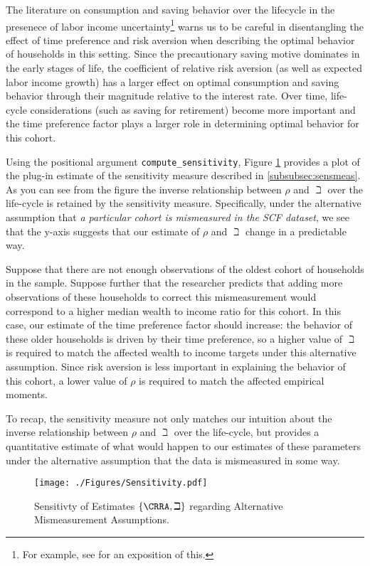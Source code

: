\documentclass[\econtexRoot/SolvingMicroDSOPs]{subfiles}
\begin{document}
The literature on consumption and saving behavior over the lifecycle in the presenece of labor income uncertainty\footnote{For example, see \cite{gpLifecycle} for an exposition of this.} warns us to be careful in disentangling the effect of time preference and risk aversion when describing the optimal behavior of households in this setting.  Since the precautionary saving motive dominates in the early stages of life, the coefficient of relative risk aversion (as well as expected labor income growth) has a larger effect on optimal consumption and saving behavior through their magnitude relative to the interest rate. Over time, life-cycle considerations (such as saving for retirement) become more important and the time preference factor plays a larger role in determining optimal behavior for this cohort.

Using the positional argument \texttt{compute\_sensitivity}, Figure \ref{fig:PlotSensitivityMeasure} provides a plot of the plug-in estimate of the sensitivity measure described in \ref{subsubsec:sensmeas}. As you can see from the figure the inverse relationship between $\rho$ and $\beth$ over the life-cycle is retained by the sensitivity measure. Specifically, under the alternative assumption that \textit{a particular cohort is mismeasured in the SCF dataset}, we see that the y-axis suggests that our estimate of $\rho$ and $\beth$ change in a predictable way.

Suppose that there are not enough observations of the oldest cohort of households in the sample. Suppose further that the researcher predicts that adding more observations of these households to correct this mismeasurement would correspond to a higher median wealth to income ratio for this cohort. In this case, our estimate of the time preference factor should increase: the behavior of these older households is driven by their time preference, so a higher value of $\beth$ is required to match the affected wealth to income targets under this alternative assumption. Since risk aversion is less important in explaining the behavior of this cohort, a lower value of $\rho$ is required to match the affected empirical moments.

To recap, the sensitivity measure not only matches our intuition about the inverse relationship between $\rho$ and $\beth$ over the life-cycle, but provides a quantitative estimate of what would happen to our estimates of these parameters under the alternative assumption that the data is mismeasured in some way.

\hypertarget{PlotSensitivityMeasure}{}
\begin{figure}
  \texttt{[image: ./Figures/Sensitivity.pdf]}
  \caption{Sensitivty of Estimates $\{\CRRA,\beth\}$ regarding Alternative Mismeasurement Assumptions.}
  \label{fig:PlotSensitivityMeasure}
\end{figure}
\end{document}
